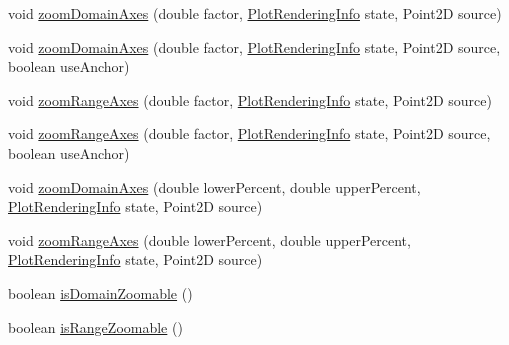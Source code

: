\begin{DoxyCompactItemize}
\item 
void \mbox{\hyperlink{classorg_1_1jfree_1_1chart_1_1plot_1_1_thermometer_plot_a9c12b9a44aa98bcf6d93fcc6a17e2ffd}{zoom\+Domain\+Axes}} (double factor, \mbox{\hyperlink{classorg_1_1jfree_1_1chart_1_1plot_1_1_plot_rendering_info}{Plot\+Rendering\+Info}} state, Point2D source)
\item 
void \mbox{\hyperlink{classorg_1_1jfree_1_1chart_1_1plot_1_1_thermometer_plot_affa0829b3d886e9449c46b9de61bd703}{zoom\+Domain\+Axes}} (double factor, \mbox{\hyperlink{classorg_1_1jfree_1_1chart_1_1plot_1_1_plot_rendering_info}{Plot\+Rendering\+Info}} state, Point2D source, boolean use\+Anchor)
\item 
void \mbox{\hyperlink{classorg_1_1jfree_1_1chart_1_1plot_1_1_thermometer_plot_a55a57e5d8466bca6547f2e9eb2115d43}{zoom\+Range\+Axes}} (double factor, \mbox{\hyperlink{classorg_1_1jfree_1_1chart_1_1plot_1_1_plot_rendering_info}{Plot\+Rendering\+Info}} state, Point2D source)
\item 
void \mbox{\hyperlink{classorg_1_1jfree_1_1chart_1_1plot_1_1_thermometer_plot_abbfd841a9dc1d2cd6d28db24f19f7968}{zoom\+Range\+Axes}} (double factor, \mbox{\hyperlink{classorg_1_1jfree_1_1chart_1_1plot_1_1_plot_rendering_info}{Plot\+Rendering\+Info}} state, Point2D source, boolean use\+Anchor)
\item 
void \mbox{\hyperlink{classorg_1_1jfree_1_1chart_1_1plot_1_1_thermometer_plot_a3cbbcfa1a2488b10bd600f1757d41fec}{zoom\+Domain\+Axes}} (double lower\+Percent, double upper\+Percent, \mbox{\hyperlink{classorg_1_1jfree_1_1chart_1_1plot_1_1_plot_rendering_info}{Plot\+Rendering\+Info}} state, Point2D source)
\item 
void \mbox{\hyperlink{classorg_1_1jfree_1_1chart_1_1plot_1_1_thermometer_plot_a10c451885ff51839a91fe7e46a6c645d}{zoom\+Range\+Axes}} (double lower\+Percent, double upper\+Percent, \mbox{\hyperlink{classorg_1_1jfree_1_1chart_1_1plot_1_1_plot_rendering_info}{Plot\+Rendering\+Info}} state, Point2D source)
\item 
boolean \mbox{\hyperlink{classorg_1_1jfree_1_1chart_1_1plot_1_1_thermometer_plot_a6685f62ba19ca11218dc82abb997be1e}{is\+Domain\+Zoomable}} ()
\item 
boolean \mbox{\hyperlink{classorg_1_1jfree_1_1chart_1_1plot_1_1_thermometer_plot_adc804a5ef2e701dfaf6911c33bd178f3}{is\+Range\+Zoomable}} ()
\end{DoxyCompactItemize}
